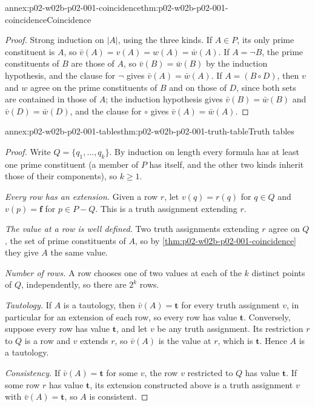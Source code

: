 \begin{annexitem}{annex:p02-w02b-p02-001-coincidence}{thm:p02-w02b-p02-001-coincidence}{Coincidence}
\begin{proof}
Strong induction on \(|A|\), using the three kinds.  If \(A\in P\), its
only prime constituent is \(A\), so \(\bar v(A)=v(A)=w(A)=\bar w(A)\).  If
\(A=\neg B\), the prime constituents of \(B\) are those of \(A\), so
\(\bar v(B)=\bar w(B)\) by the induction hypothesis, and the clause for
\(\neg\) gives \(\bar v(A)=\bar w(A)\).  If \(A=(B\circ D)\), then \(v\) and
\(w\) agree on the prime constituents of \(B\) and on those of \(D\), since
both sets are contained in those of \(A\); the induction hypothesis gives
\(\bar v(B)=\bar w(B)\) and \(\bar v(D)=\bar w(D)\), and the clause for
\(\circ\) gives \(\bar v(A)=\bar w(A)\).
\end{proof}
\end{annexitem}

\begin{annexitem}{annex:p02-w02b-p02-001-tables}{thm:p02-w02b-p02-001-truth-table}{Truth tables}
\begin{proof}
Write \(Q=\{q_1,\ldots,q_k\}\).  By induction on length every formula has
at least one prime constituent (a member of \(P\) has itself, and the
other two kinds inherit those of their components), so \(k\geq1\).

\emph{Every row has an extension.}  Given a row \(r\), let \(v(q)=r(q)\)
for \(q\in Q\) and \(v(p)=\mathbf f\) for \(p\in P-Q\).  This is a truth
assignment extending \(r\).

\emph{The value at a row is well defined.}  Two truth assignments extending
\(r\) agree on \(Q\), the set of prime constituents of \(A\), so by
\cref{thm:p02-w02b-p02-001-coincidence} they give \(A\) the same value.

\emph{Number of rows.}  A row chooses one of two values at each of the
\(k\) distinct points of \(Q\), independently, so there are \(2^k\) rows.

\emph{Tautology.}  If \(A\) is a tautology, then \(\bar v(A)=\mathbf t\) for
every truth assignment \(v\), in particular for an extension of each row,
so every row has value \(\mathbf t\).  Conversely, suppose every row has
value \(\mathbf t\), and let \(v\) be any truth assignment.  Its restriction
\(r\) to \(Q\) is a row and \(v\) extends \(r\), so
\(\bar v(A)\) is the value at \(r\), which is \(\mathbf t\).  Hence \(A\) is
a tautology.

\emph{Consistency.}  If \(\bar v(A)=\mathbf t\) for some \(v\), the row
\(v\) restricted to \(Q\) has value \(\mathbf t\).  If some row \(r\) has
value \(\mathbf t\), its extension constructed above is a truth assignment
\(v\) with \(\bar v(A)=\mathbf t\), so \(A\) is consistent.
\end{proof}
\end{annexitem}

